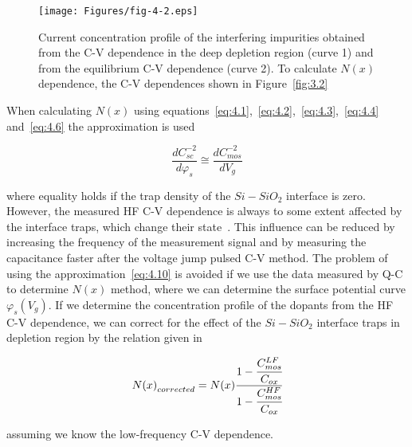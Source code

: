 \begin{figure}[h!]\centering
  \begin{minipage}[c]{\myfiguresize}
    \begin{center}
      \texttt{[image: Figures/fig-4-2.eps]}%
      \caption[Concentration profile of interfering impurities
        obtained from C-V dependence in the deep depletion region and
        from the equilibrium C-V dependence]{Current concentration
        profile of the interfering impurities obtained from the C-V
        dependence in the deep depletion region (curve 1) and from the
        equilibrium C-V dependence (curve 2). To calculate $N(x)$
        dependence, the C-V dependences shown in
        Figure~\ref{fig:3.2}}\label{fig:4.2}
    \end{center}
  \end{minipage}
\end{figure}

\par When calculating $N(x)$ using
equations~\ref{eq:4.1},~\ref{eq:4.2},~\ref{eq:4.3},~\ref{eq:4.4}
and~\ref{eq:4.6} the approximation is used

\begin{equation}\label{eq:4.10}
  \frac{dC_{sc}^{-2}}{d\varphi_{s}} \cong \frac{dC_{mos}^{-2}}{dV_{g}}
\end{equation}

where equality holds if the trap density of the $Si-SiO_{2}$ interface
is zero. However, the measured HF C-V dependence is always to some
extent affected by the interface traps, which change their
state~\cite{4.15}. This influence can be reduced by increasing the
frequency of the measurement signal and by measuring the capacitance
faster after the voltage jump pulsed C-V method.  The problem of using
the approximation~\ref{eq:4.10} is avoided if we use the data measured
by Q-C to determine $N(x)$ method, where we can determine the surface
potential curve $\varphi_{s}(V_{g})$. If we determine the
concentration profile of the dopants from the HF C-V dependence, we
can correct for the effect of the $Si-SiO_{2}$ interface traps in
depletion region by the relation given in~\cite{I.1}

\begin{equation}\label{eq:4.11}
  {N(x)}_{corrected} = {N(x)}{\cfrac{1-\cfrac{C_{mos}^{LF}}{C_{ox}}}{1-\cfrac{C_{mos}^{HF}}{C_{ox}}}}
\end{equation}

assuming we know the low-frequency C-V dependence.

